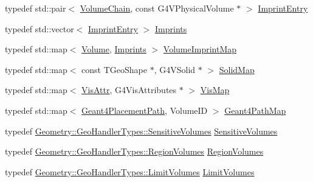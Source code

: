 \begin{DoxyCompactItemize}
typedef std\+::pair$<$ \hyperlink{namespace_d_d4hep_1_1_simulation_1_1_geant4_geometry_maps_a23aa6ab8c70ef8f0c800d00db6a7bb53}{Volume\+Chain}, const G4\+V\+Physical\+Volume $\ast$ $>$ \hyperlink{namespace_d_d4hep_1_1_simulation_1_1_geant4_geometry_maps_ab7b5bc15fa7417d422647be899d10c88}{Imprint\+Entry}
\item 
typedef std\+::vector$<$ \hyperlink{namespace_d_d4hep_1_1_simulation_1_1_geant4_geometry_maps_ab7b5bc15fa7417d422647be899d10c88}{Imprint\+Entry} $>$ \hyperlink{namespace_d_d4hep_1_1_simulation_1_1_geant4_geometry_maps_a44385b9a0b879f5b5a4f11c606cbd968}{Imprints}
\item 
typedef std\+::map$<$ \hyperlink{class_d_d4hep_1_1_geometry_1_1_volume}{Volume}, \hyperlink{namespace_d_d4hep_1_1_simulation_1_1_geant4_geometry_maps_a44385b9a0b879f5b5a4f11c606cbd968}{Imprints} $>$ \hyperlink{namespace_d_d4hep_1_1_simulation_1_1_geant4_geometry_maps_aade714d6f596f4d83009dcc2f3968d86}{Volume\+Imprint\+Map}
\item 
typedef std\+::map$<$ const T\+Geo\+Shape $\ast$, G4\+V\+Solid $\ast$ $>$ \hyperlink{namespace_d_d4hep_1_1_simulation_1_1_geant4_geometry_maps_a5591dbffcd2e6432004034209abd630e}{Solid\+Map}
\item 
typedef std\+::map$<$ \hyperlink{class_d_d4hep_1_1_geometry_1_1_vis_attr}{Vis\+Attr}, G4\+Vis\+Attributes $\ast$ $>$ \hyperlink{namespace_d_d4hep_1_1_simulation_1_1_geant4_geometry_maps_af7bb137248b77047dc34ff68d67225eb}{Vis\+Map}
\item 
typedef std\+::map$<$ \hyperlink{namespace_d_d4hep_1_1_simulation_1_1_geant4_geometry_maps_a8a325934adb143cb1cbc47dd030395ed}{Geant4\+Placement\+Path}, Volume\+ID $>$ \hyperlink{namespace_d_d4hep_1_1_simulation_1_1_geant4_geometry_maps_a3d68bbc4e8d7a581a15f66d773dac6e7}{Geant4\+Path\+Map}
\item 
typedef \hyperlink{class_d_d4hep_1_1_geometry_1_1_geo_handler_types_a530cdc551e68a5f975fe294329d27e63}{Geometry\+::\+Geo\+Handler\+Types\+::\+Sensitive\+Volumes} \hyperlink{namespace_d_d4hep_1_1_simulation_1_1_geant4_geometry_maps_a4b4bd41ff250c41737c7a73223fab910}{Sensitive\+Volumes}
\item 
typedef \hyperlink{class_d_d4hep_1_1_geometry_1_1_geo_handler_types_a8e121c3a06f16781bbabba4528136654}{Geometry\+::\+Geo\+Handler\+Types\+::\+Region\+Volumes} \hyperlink{namespace_d_d4hep_1_1_simulation_1_1_geant4_geometry_maps_a9fc457ad93d6235197e7e1ab013d1f56}{Region\+Volumes}
\item 
typedef \hyperlink{class_d_d4hep_1_1_geometry_1_1_geo_handler_types_ad8397c24589a1508baf0735bdb2b3c77}{Geometry\+::\+Geo\+Handler\+Types\+::\+Limit\+Volumes} \hyperlink{namespace_d_d4hep_1_1_simulation_1_1_geant4_geometry_maps_a3b9008449a71468a115373b9819457df}{Limit\+Volumes}
\end{DoxyCompactItemize}
